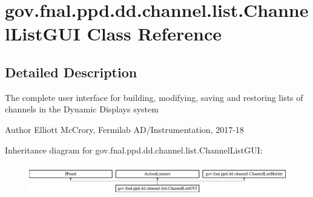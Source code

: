 \hypertarget{classgov_1_1fnal_1_1ppd_1_1dd_1_1channel_1_1list_1_1ChannelListGUI}{\section{gov.\-fnal.\-ppd.\-dd.\-channel.\-list.\-Channel\-List\-G\-U\-I Class Reference}
\label{classgov_1_1fnal_1_1ppd_1_1dd_1_1channel_1_1list_1_1ChannelListGUI}
}


\subsection{Detailed Description}
The complete user interface for building, modifying, saving and restoring lists of channels in the Dynamic Displays system

\begin{DoxyAuthor}{Author}
Elliott Mc\-Crory, Fermilab A\-D/\-Instrumentation, 2017-\/18 
\end{DoxyAuthor}
Inheritance diagram for gov.\-fnal.\-ppd.\-dd.\-channel.\-list.\-Channel\-List\-G\-U\-I\-:\begin{figure}[H]
\begin{center}
\leavevmode
\includegraphics[height=1.398252cm]{classgov_1_1fnal_1_1ppd_1_1dd_1_1channel_1_1list_1_1ChannelListGUI}
\end{center}
\end{figure}
